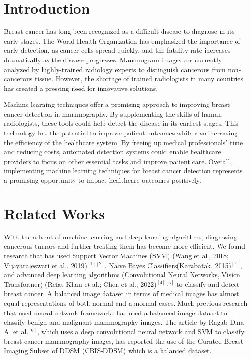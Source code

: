 \documentclass[11pt,letterpaper, twocolumn]{article}
\begin{document}
\section{Introduction}
Breast cancer has long been recognized as a difficult disease to diagnose in its early stages. The World Health Organization has emphasized the importance of early detection, as cancer cells spread quickly, and the fatality rate increases dramatically as the disease progresses. Mammogram images are currently analyzed by highly-trained radiology experts to distinguish cancerous from non-cancerous tissue. However, the shortage of trained radiologists in many countries has created a pressing need for innovative solutions.

Machine learning techniques offer a promising approach to improving breast cancer detection in mammography. By supplementing the skills of human radiologists, these tools could help detect the disease in its earliest stages. This technology has the potential to improve patient outcomes while also increasing the efficiency of the healthcare system. By freeing up medical professionals' time and reducing costs, automated detection systems could enable healthcare providers to focus on other essential tasks and improve patient care. Overall, implementing machine learning techniques for breast cancer detection represents a promising opportunity to impact healthcare outcomes positively.

\section{Related Works}
With the advent of machine learning and deep learning algorithms, diagnosing cancerous tumors and further treating them has become more efficient. We found research that has used Support Vector Machines (SVM) (Wang et al., 2018; Vijayarajeswari et al., 2019)${}^{[1][2]}$,  Naive Bayes Classifiers(Karabatak, 2015)${}^{[3]}$, and advanced deep learning algorithms (Convolutional Neural Networks, Vision Transformer) (Refat Khan et al.; Chen et al., 2022)${}^{[4][5]}$ to classify and detect breast cancer.
A balanced image dataset in terms of medical images has almost equal representations of both normal and abnormal cases. Much previous research that used neural network frameworks has used a balanced image dataset to classify benign and malignant mammography images. The article by Ragab Dina A. et al.${}^{[6]}$, which uses a deep convolutional neural network and SVM to classify breast cancer mammography images, has reported the use of the Curated Breast Imaging Subset of DDSM (CBIS-DDSM) which is a balanced dataset.
\end{document}
